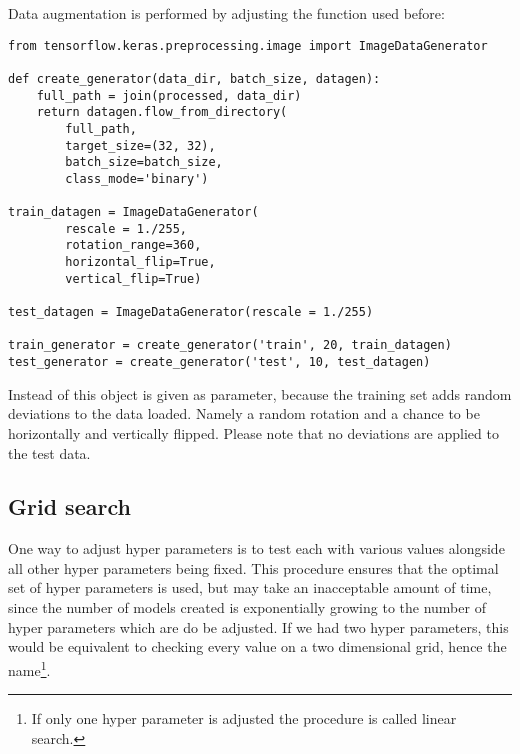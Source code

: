 Data augmentation is performed by adjusting the  function used before:

\begin{lstlisting}
from tensorflow.keras.preprocessing.image import ImageDataGenerator

def create_generator(data_dir, batch_size, datagen):
    full_path = join(processed, data_dir)
    return datagen.flow_from_directory(
        full_path,
        target_size=(32, 32),
        batch_size=batch_size,
        class_mode='binary')

train_datagen = ImageDataGenerator(
        rescale = 1./255,
        rotation_range=360,
        horizontal_flip=True,
        vertical_flip=True)

test_datagen = ImageDataGenerator(rescale = 1./255)

train_generator = create_generator('train', 20, train_datagen)
test_generator = create_generator('test', 10, test_datagen)
\end{lstlisting}

Instead of  this object is given as parameter, because the training set adds random deviations to the data loaded. Namely a random rotation and a chance to be horizontally and vertically flipped.
Please note that no deviations are applied to the test data.

\subsection{Grid search}
One way to adjust hyper parameters is to test each with various values alongside all other hyper parameters being fixed.
This procedure ensures that the optimal set of hyper parameters is used, but may take an inacceptable amount of time, since the number of models created is exponentially growing to the number of hyper parameters which are do be adjusted.
If we had two hyper parameters, this would be equivalent to checking every value on a two dimensional grid, hence the name\footnote{If only one hyper parameter is adjusted the procedure is called linear search.}.
